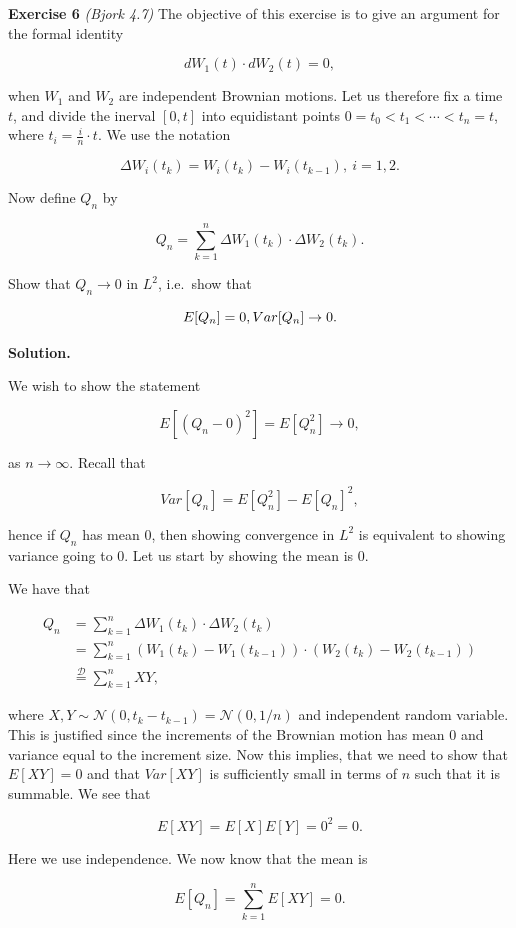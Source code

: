 \documentclass[
]{book}
\begin{document}
\textbf{Exercise 6} \emph{(Bjork 4.7)} The objective of this exercise is to give an argument for the formal identity

\[
dW_1(t)\cdot dW_2(t)=0,
\]

when \(W_1\) and \(W_2\) are independent Brownian motions. Let us therefore fix a time \(t\), and divide the inerval \([0,t]\) into equidistant points \(0=t_0<t_1<\cdots < t_n=t\), where \(t_i=\frac{i}{n}\cdot t\). We use the notation

\[
\Delta W_i(t_k)=W_i(t_k)-W_i(t_{k-1}),\ i=1,2.
\]

Now define \(Q_n\) by

\[
Q_n=\sum_{k=1}^n \Delta W_1(t_k)\cdot \Delta W_2(t_k).
\]

Show that \(Q_n\to 0\) in \(L^2\), i.e.~show that

\[
E[Q_n]=0,\\
Var[Q_n]\to 0.
\]

\textbf{Solution.}

We wish to show the statement

\[
E[(Q_n-0)^2]=E[Q_n^2]\to 0,
\]

as \(n\to \infty\). Recall that

\[
Var[Q_n]=E[Q_n^2]-E[Q_n]^2,
\]

hence if \(Q_n\) has mean 0, then showing convergence in \(L^2\) is equivalent to showing variance going to 0. Let us start by showing the mean is 0.

We have that

\begin{align*}
Q_n&=\sum_{k=1}^n \Delta W_1(t_k)\cdot \Delta W_2(t_k)\\
&=\sum_{k=1}^n(W_1(t_k)-W_1(t_{k-1}))\cdot (W_2(t_k)-W_2(t_{k-1}))\\
&\stackrel{\mathcal{D}}{=}\sum_{k=1}^nXY,
\end{align*}

where \(X,Y\sim\mathcal{N}(0,t_k-t_{k-1})=\mathcal{N}(0,1/n)\) and independent random variable. This is justified since the increments of the Brownian motion has mean 0 and variance equal to the increment size. Now this implies, that we need to show that \(E[XY]=0\) and that \(Var[XY]\) is sufficiently small in terms of \(n\) such that it is summable. We see that

\[
E[XY]=E[X]E[Y]=0^2=0.
\]

Here we use independence. We now know that the mean is

\[
E[Q_n]=\sum_{k=1}^nE[XY]=0.
\]
\end{document}
